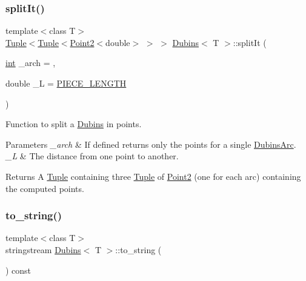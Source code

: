 \subsubsection{\texorpdfstring{splitIt()}{splitIt()}}
{\footnotesize\ttfamily template$<$class T$>$ \\
\mbox{\hyperlink{class_tuple}{Tuple}}$<$\mbox{\hyperlink{class_tuple}{Tuple}}$<$\mbox{\hyperlink{class_point2}{Point2}}$<$double$>$ $>$ $>$ \mbox{\hyperlink{class_dubins}{Dubins}}$<$ T $>$\+::split\+It (\begin{DoxyParamCaption}\item[{\mbox{\hyperlink{draw_8hh_aa620a13339ac3a1177c86edc549fda9b}{int}}}]{\+\_\+arch = {},  }\item[{double}]{\+\_\+L = {\ttfamily \mbox{\hyperlink{dubins_8hh_a5b2500ca93a5100f73dc442d3cfea7d4}{P\+I\+E\+C\+E\+\_\+\+L\+E\+N\+G\+TH}}} }\end{DoxyParamCaption})\hspace{0.3cm}{\ttfamily [inline]}}

Function to split a \mbox{\hyperlink{class_dubins}{Dubins}} in points. 
\begin{DoxyParams}{Parameters}
{\em \+\_\+arch} & If defined returns only the points for a single {\ttfamily \mbox{\hyperlink{class_dubins_arc}{Dubins\+Arc}}}. \\
\hline
{\em \+\_\+L} & The distance from one point to another. \\
\hline
\end{DoxyParams}
\begin{DoxyReturn}{Returns}
A {\ttfamily \mbox{\hyperlink{class_tuple}{Tuple}}} containing three {\ttfamily \mbox{\hyperlink{class_tuple}{Tuple}}} of {\ttfamily \mbox{\hyperlink{class_point2}{Point2}}} (one for each arc) containing the computed points. 
\end{DoxyReturn}
\mbox{\label{class_dubins_a08abdf02352b6d47aafeea1eed9bfbfe}} 
\subsubsection{\texorpdfstring{to\_string()}{to\_string()}}
{\footnotesize\ttfamily template$<$class T$>$ \\
stringstream \mbox{\hyperlink{class_dubins}{Dubins}}$<$ T $>$\+::to\+\_\+string (\begin{DoxyParamCaption}{ }\end{DoxyParamCaption}) const\hspace{0.3cm}{\ttfamily [inline]}}

